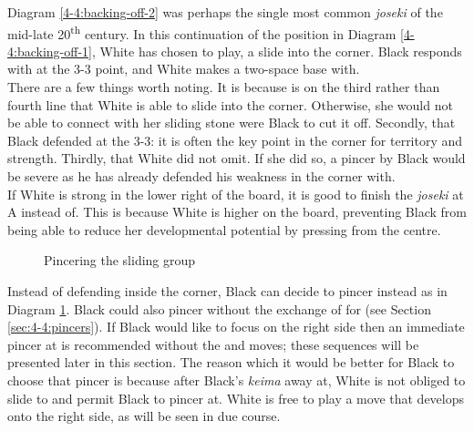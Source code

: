 \documentclass[a5paper,12pt,twoside]{book} %
\newcounter{joseki}                 %
\newcommand{\dref}[1]{Diagram \ref{#1}}
\newcommand{\addstufftotoc}[2][toc]{%
  \addtocontents{#1}{#2}}
\begin{document}
\dref{4-4:backing-off-2} was perhaps the single most common \textit{joseki} of the mid-late 20\textsuperscript{th} century. In this continuation of the position in \dref{4-4:backing-off-1}, White has chosen to play{\large\whitestone[3]}, a slide into the corner. Black responds with{\large\blackstone[2]} at the 3-3 point, and White makes a two-space base with{\large\whitestone[5]}. \\

There are a few things worth noting. It is because{\large\whitestone[1]} is on the third rather than fourth line that White is able to slide into the corner. Otherwise, she would not be able to connect with her sliding stone were Black to cut it off. Secondly, that Black defended at the 3-3: it is often the key point in the corner for territory and strength. Thirdly, that White did not omit{\large\whitestone[5]}. If she did so, a pincer by Black would be severe as he has already defended his weakness in the corner with{\large\blackstone[4]}.\\

If White is strong in the lower right of the board, it is good to finish the \textit{joseki} at A instead of{\large\whitestone[5]}. This is because White is higher on the board, preventing Black from being able to reduce her developmental potential by pressing from the centre.\\

\begin{figure}[!htbp]
 
\vspace{-0.6cm}\caption{Pincering the sliding group}
\label{4-4:backing-off-3}
\end{figure}

\addstufftotoc{\nobreak\smallskip\protect\par}

Instead of defending inside the corner, Black can decide to pincer instead as in \dref{4-4:backing-off-3}. Black could also pincer without the exchange of{\large\blackstone[2]} for{\large\whitestone[3]} (see Section \ref{sec:4-4:pincers}). If Black would like to focus on the right side then an immediate pincer at{\large\blackstone[4]} is recommended without the{\large\blackstone[2]} and{\large\whitestone[3]} moves; these sequences will be presented later in this section. The reason which it would be better for Black to choose that pincer is because after Black's \textit{keima} away at{\large\blackstone[2]}, White is not obliged to slide to{\large\whitestone[3]} and permit Black to pincer at{\large\blackstone[4]}. White is free to play a move that develops onto the right side, as will be seen in due course.\\
\end{document}
